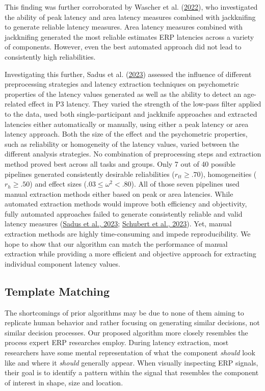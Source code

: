 \documentclass[
  man]{apa7}
\begin{document}
This finding was further corroborated by Wascher et al. (\protect\hyperlink{ref-wascher2022mental}{2022}), who investigated the ability of peak latency and area latency measures combined with jackknifing to generate reliable latency measures. Area latency measures combined with jackknifing generated the most reliable estimates ERP latencies across a variety of components. However, even the best automated approach did not lead to consistently high reliabilities.

Investigating this further, Sadus et al. (\protect\hyperlink{ref-sadus2023multiverse}{2023}) assessed the influence of different preprocessing strategies and latency extraction techniques on psychometric properties of the latency values generated as well as the ability to detect an age-related effect in P3 latency. They varied the strength of the low-pass filter applied to the data, used both single-participant and jackknife approaches and extracted latencies either automatically or manually, using either a peak latency or area latency approach. Both the size of the effect and the psychometric properties, such as reliability or homogeneity of the latency values, varied between the different analysis strategies. No combination of preprocessing steps and extraction method proved best across all tasks and groups. Only 7 out of 40 possible pipelines generated consistently desirable reliabilities (\(r_{tt} \ge .70\)), homogeneities (\(r_{h} \ge .50\)) and effect sizes (\(.03 \le \omega^2 <.80\)). All of those seven pipelines used manual extraction methods either based on peak or area latencies. While automated extraction methods would improve both efficiency and objectivity, fully automated approaches failed to generate consistently reliable and valid latency measures (\protect\hyperlink{ref-sadus2023multiverse}{Sadus et al., 2023}; \protect\hyperlink{ref-schubert2023robust}{Schubert et al., 2023}). Yet, manual extraction methods are highly time-consuming and impede reproducibility. We hope to show that our algorithm can match the performance of manual extraction while providing a more efficient and objective approach for extracting individual component latency values.

\hypertarget{template-matching}{%
\subsection{Template Matching}\label{template-matching}}

The shortcomings of prior algorithms may be due to none of them aiming to replicate human behavior and rather focusing on generating similar decisions, not similar decision processes. Our proposed algorithm more closely resembles the process expert ERP researches employ. During latency extraction, most researchers have some mental representation of what the component \emph{should} look like and where it \emph{should} generally appear. When visually inspecting ERP signals, their goal is to identify a pattern within the signal that resembles the component of interest in shape, size and location.
\end{document}
